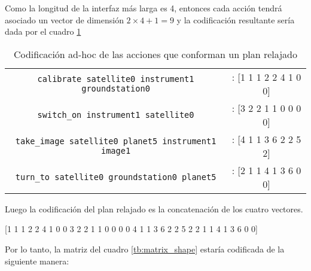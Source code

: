 Como la longitud de la interfaz más larga es 4, entonces cada acción tendrá
asociado un vector de dimensión $2 \times 4 + 1 = 9$ y la codificación
resultante sería dada por el cuadro \ref{tab:ohe_plan}

\begin{table}[h!]
    \centering
    \begin{tabular}{c|c}
        \verb|calibrate satellite0 instrument1 groundstation0| &: {} [1 1 1 2 2 4 1 0 0] \\
        \verb|switch_on instrument1 satellite0| &: {} [3 2 2 1 1 0 0 0 0] \\
        \verb|take_image satellite0 planet5 instrument1 image1| &: {} [4 1 1 3 6 2 2 5 2] \\
        \verb|turn_to satellite0 groundstation0 planet5| &: {} [2 1 1 4 1 3 6 0 0] \\
    \end{tabular}
    \caption{Codificación ad-hoc de las acciones que conforman un plan relajado}
    \label{tab:ohe_plan}
\end{table}

Luego la codificación del plan relajado es la concatenación de los cuatro vectores.

\begin{center}
    [1 1 1 2 2 4 1 0 0 3 2 2 1 1 0 0 0 0 4 1 1 3 6 2 2 5 2 2 1 1 4 1 3 6 0 0]
\end{center}

Por lo tanto, la matriz del cuadro \ref{tb:matrix_shape} estaría codificada de la siguiente manera:

\begin{table}[h!]
\centering
{}
 \caption{Planes relajados y acciones etiquetadas usando codificación ad-hoc.}
 \label{tb:matrix_shape_ohe}
\end{table}

